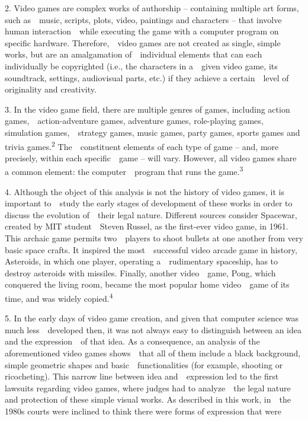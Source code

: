 \documentclass[
]{article}
\begin{document}
{2. }{Video games are complex works of authorship }{-- }{containing
multiple art forms, such as~~music, scripts, plots, video, paintings and
characters }{-- }{that involve human interaction~~while executing the
game with a computer program on specific hardware. Therefore,~~video
games are not created as single, simple works, but are an amalgamation
of~~individual elements that can each individually be copyrighted (i.e.,
the characters in a~~given video game, its soundtrack, settings,
audiovisual parts, etc.) if they achieve a certain~~level of originality
and creativity.}

{3. }{In the video game field, there are multiple genres of games,
including action games,~~action-adventure games, adventure games,
role-playing games, simulation games,~~strategy games, music games,
party games, sports games and trivia games.}\textsuperscript{{2
}}{The~~constituent elements of each type of game }{-- }{and, more
precisely, within each specific~~game }{-- }{will vary. However, all
video games share a common element: the computer~~program that runs the
game.}\textsuperscript{{3}}

{4. }{Although the object of this analysis is not the history of video
games, it is important to~~study the early stages of development of
these works in order to discuss the evolution of~~their legal nature.
Different sources consider }{Spacewar, }{created by MIT student~~Steven
Russel, as the first-ever video game, in 1961. This archaic game permits
two~~players to shoot bullets at one another from very basic space
crafts. It inspired the most~~successful video arcade game in history,
}{Asteroids, }{in which one player, operating a~~rudimentary spaceship,
has to destroy asteroids with missiles. Finally, another video~~game,
}{Pong, }{which conquered the living room, became the most popular home
video~~game of its time, and was widely copied.}\textsuperscript{{4}}

{5. }{In the early days of video game creation, and given that computer
science was much less~~developed then, it was not always easy to
distinguish between an idea and the expression~~of that idea. As a
consequence, an analysis of the aforementioned video games shows~~that
all of them include a black background, simple geometric shapes and
basic~~functionalities (for example, shooting or ricocheting). This
narrow line between idea and~~expression led to the first lawsuits
regarding video games, where judges had to analyze~~the legal nature and
protection of these simple visual works. As described in this work,
in~~the 1980s courts were inclined to think there were forms of
expression that were}
\end{document}

